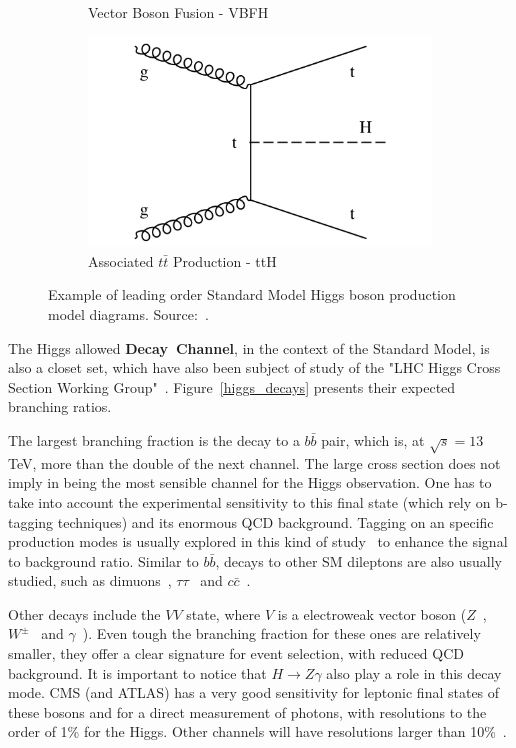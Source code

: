 \begin{figure}[htbp]
\begin{subfigure}[htbp]{0.48\textwidth}
    \caption{Vector Boson Fusion - VBFH}
  \end{subfigure}
  \hfill
  \begin{subfigure}[htbp]{0.48\textwidth}
    \centering
    \includegraphics[width=\textwidth]{figures_and_tables/theory/higgs_prod_and_decays/tth.pdf}
    \caption{Associated $t\bar{t}$ Production - ttH}
  \end{subfigure}
  \caption{Example of leading order Standard Model Higgs boson production model diagrams. Source:~\cite{higgs_diagrams}.}
  \label{fig_diagrams_production_modes}
\end{figure}

The Higgs allowed \mbox{\textbf{Decay Channel}}, in the context of the Standard Model, is also a closet set, which have also been subject of study of the "LHC Higgs Cross Section Working Group"~\cite{deFlorian:2016spz}. Figure~\ref{higgs_decays} presents their expected branching ratios.

The largest branching fraction is the decay to a $b\bar{b}$ pair, which is, at $\sqrt{s} = 13$ TeV, more than the double of the next channel. The large cross section does not imply in being the most sensible channel for the Higgs observation. One has to take into account the experimental sensitivity to this final state (which rely on b-tagging techniques) and its enormous QCD background. Tagging on an specific production modes is usually explored in this kind of study~\cite{cms_higgs_to_bbar} to enhance the signal to background ratio. Similar to $b\bar{b}$, decays to other SM dileptons are also usually studied, such as dimuons~\cite{cms_higgs_mumu}, $\tau\tau$~\cite{cms_higgs_to_tautau} and  $c\bar{c}$~\cite{cms_higgs_to_ccbar}. 

Other decays include the $VV$ state, where $V$ is a electroweak vector boson ($Z$~\cite{Sirunyan:2018sgc}, $W^{\pm}$~\cite{Sirunyan:2020tzo} and $\gamma$~\cite{Sirunyan:2020xwk}). Even tough the branching fraction for these ones are relatively smaller, they offer a clear signature for event selection, with reduced QCD background. It is important to notice that $H \rightarrow Z\gamma$ also play a role in this decay mode. CMS (and ATLAS) has a very good sensitivity for leptonic final states of these bosons and for a direct measurement of photons, with resolutions to the order of 1\% for the Higgs. Other channels will have resolutions larger than 10\%~\cite{pdg_2020}.

